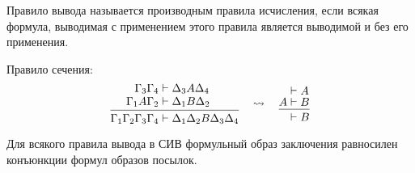 \documentclass[main]{subfiles}
\begin{document}
\begin{definition}
    Правило вывода называется производным правила исчисления, если всякая формула, выводимая с применением этого правила является выводимой и без его применения.
\end{definition}
\begin{example}
    Правило сечения:
    \begin{gather*}
        \begin{prooftree}
            \hypo{\Gamma_3 \Gamma_4 &\vdash \Delta_3 A \Delta_4}
            \infer[no rule]1{\Gamma_1 A \Gamma_2 &\vdash \Delta_1 B \Delta_2}
            \infer1{\Gamma_1 \Gamma_2 \Gamma_3 \Gamma_4 &\vdash \Delta_1 \Delta_2 B \Delta_3 \Delta_4}
        \end{prooftree}
        \quad \rightsquigarrow\quad
        \begin{prooftree}
            \hypo{&\vdash A}
            \infer[no rule]1{A &\vdash B}
            \infer1{&\vdash B}
        \end{prooftree}
    \end{gather*}
\end{example}
\begin{lemma}
    Для всякого правила вывода в СИВ формульный образ заключения равносилен конъюнкции формул образов посылок.
\end{lemma}
\end{document}
